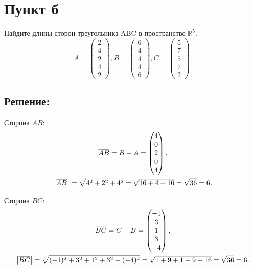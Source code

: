 \documentclass[12pt]{article}
\begin{document}
    \section*{Пункт б}
    Найдите длины сторон треугольника ABC в пространстве $\mathbb{R}^5$.
    \[
        A =
        \begin{pmatrix}
            2 \\ 4 \\ 2 \\ 4 \\ 2
        \end{pmatrix},
        B =
        \begin{pmatrix}
            6 \\ 4 \\ 4 \\ 4 \\ 6
        \end{pmatrix},
        C =
        \begin{pmatrix}
            5 \\ 7 \\ 5 \\ 7 \\ 2
        \end{pmatrix}.
    \]

    \subsection*{Решение:}
    Сторона $\overline{AB}$:
    \begin{gather*}
        \overline{AB}
        = B - A
        = \begin{pmatrix}
              4 \\ 0 \\ 2 \\ 0 \\ 4
        \end{pmatrix}, \\
        \left | \overline{AB} \right |
        = \sqrt{4^2 + 2^2 + 4^2}
        = \sqrt{16 + 4 + 16}
        = \sqrt{36}
        = 6 .
    \end{gather*}

    Сторона $BC$:
    \begin{gather*}
        \overline{BC}
        = C - B
        = \begin{pmatrix}
              -1 \\ 3 \\ 1 \\ 3 \\ -4
        \end{pmatrix}, \\
        \left | \overline{BC} \right |
        = \sqrt{(-1)^2 + 3^2 + 1^2 + 3^2 + (-4)^2}
        = \sqrt{1 + 9 + 1 + 9 + 16}
        = \sqrt{36}
        = 6 .
    \end{gather*}
\end{document}
